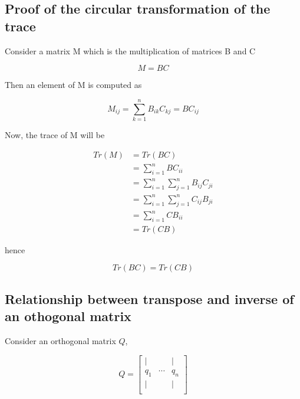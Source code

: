 \documentclass[12pt,journal]{IEEEtran}
\begin{document}
    \subsection{Proof of the circular transformation of the trace} \label{circular_trace}

    Consider a matrix M which is the multiplication of matrices B and C

    \begin{equation*}
        M = BC
    \end{equation*}

    Then an element of M is computed as

    \begin{equation*}
        M_{ij} = \sum_{k=1}^n B_{ik} C_{kj} = BC_{ij}
    \end{equation*}

    Now, the trace of M will be

    \begin{equation*}
        \begin{aligned}
            Tr(M) &= Tr(BC)\\
                  &= \sum_{i=1}^n BC_{ii}\\
                  &= \sum_{i=1}^n \sum_{j=1}^n B_{ij} C_{ji}\\
                  &= \sum_{i=1}^n \sum_{j=1}^n C_{ij} B_{ji}\\
                  &= \sum_{i=1}^n CB_{ii}\\
                  &= Tr(CB)
        \end{aligned}
    \end{equation*}

    hence

    \begin{equation*}
        Tr(BC) = Tr(CB)
    \end{equation*}

    \subsection{Relationship between transpose and inverse of an othogonal matrix}
    \label{orthogonal}

    Consider an orthogonal matrix $Q$,

    \[
        Q =
        \begin{bmatrix}
             |  &        &  | \\
            q_1 & \cdots & q_n\\
             |  &        &  | \\
        \end{bmatrix}
    \]
\end{document}
